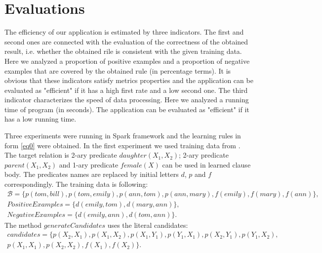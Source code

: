 \documentclass{scrartcl}
\begin{document}
\section{Evaluations}

The efficiency of our application is estimated by three indicators. The first and second ones are connected with the evaluation of the correctness of the obtained result, i.e. whether the obtained rile is consistent with the given training data. Here we analyzed a proportion of positive examples and a proportion of negative examples that are covered by the obtained rule (in percentage terms). It is obvious that these indicators satisfy metrics properties and the application can be evaluated as  \textrm{"}efficient\textrm{"} if it has a high first rate and a low second one.
The third indicator characterizes the speed of data processing. Here we analyzed a running time of program (in seconds). The application can be evaluated as  \textrm{"}efficient\textrm{"} if it has a low running time.

Three experiments were running in Spark framework and the learning rules in form \eqref{eq0} were obtained.
In the first experiment we used training data from \citep{Horvath2016}. The target relation is 2-ary predicate $daughter(X_1,X_2)$;  2-ary predicate $parent(X_1,X_2)$ and 1-ary predicate $female(X)$ can be used in learned clause body. The predicates names are replaced by initial letters $d$, $p$ and $f$ correspondingly.  The training data is following:
\begin{multline}\label{eq13a}
\!\!\!\!\mathcal{B}= \{p(tom, bill), p(tom, emily), p(ann, tom), p(ann, mary),
f(emily), f(mary), f(ann)\},\\
PositiveExamples= \{d(emily, tom), d(mary, ann) \},\\
NegativeExamples= \{ d(emily, ann), d(tom, ann)\}.
\end{multline}
The method $generateCandidates$ uses the literal candidates:
\begin{multline}\label{eq13b}
candidates=\{
p(X_2, X_1), p(X_1, X_2), p(X_1, Y_1), p(Y_1, X_1), p(X_2, Y_1), p(Y_1, X_2),\\ p(X_1, X_1), p(X_2, X_2), f(X_1),f(X_2)\}.
\end{multline}
\end{document}
